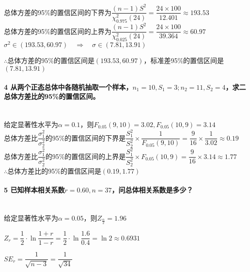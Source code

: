 \documentclass[UTF8]{ctexart}
\begin{document}
总体方差的95\%的置信区间的下界为$\dfrac{(n-1)S^2}{\chi^2_{0.975}(24)}=\dfrac{24\times 100}{12.401}\approx193.53$
~\\

总体方差的95\%的置信区间的上界为$\dfrac{(n-1)S^2}{\chi^2_{0.025}(24)}=\dfrac{24\times 100}{39.364}\approx60.97$
~\\

$\sigma^2 \in (193.53,60.97) \quad \Rightarrow \quad \sigma \in(7.81,13.91)$

$\therefore$总体方差的95\%的置信区间是$(193.53,60.97)$，标准差95\%的置信区间是$(7.81,13.91)$


\paragraph{4 从两个正态总体中各随机抽取一个样本，$n_1=10, S_1=3; n_2=11, S_2=4$，求二总体方差比的95\%的置信区间。}
~\\

给定显著性水平为$\alpha=0.1$，则$F_{0.05}(9,10)=3.02,F_{0.05}(10,9)=3.14$
~\\

总体方差比$\dfrac{\sigma_1^2}{\sigma_2^2}$的95\%的置信区间的下界是$\dfrac{S_1^2}{S_2^2}\times \dfrac{1}{F_{0.05}(9,10)}=\dfrac{9}{16}\times \dfrac{1}{3.02}\approx0.19$
~\\

总体方差比$\dfrac{\sigma_1^2}{\sigma_2^2}$的95\%的置信区间的上界是$\dfrac{S_1^2}{S_2^2}\times F_{0.05}(10,9)=\dfrac{9}{16}\times 3.14\approx1.77$
~\\

$\therefore$总体方差比的95\%的置信区间是$(0.19,1.77)$


\paragraph{5 已知样本相关系数$r=0.60, n=37$，问总体相关系数是多少？}
~\\

给定显著性水平为$\alpha=0.05$，则$Z_\frac{\alpha}{2}=1.96$

$Z_r=\dfrac{1}{2}\cdot\ln\dfrac{1+r}{1-r}=\dfrac{1}{2}\cdot\ln\dfrac{1.6}{0.4}=\ln2\approx0.6931$

$SE_r=\dfrac{1}{\sqrt{n-3}}=\dfrac{1}{\sqrt{34}}$
\end{document}
